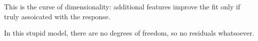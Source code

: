 \documentclass[
]{article}
\newenvironment{Shaded}{\begin{snugshade}}{\end{snugshade}}
\newcommand{\DataTypeTok}[1]{\textcolor[rgb]{0.13,0.29,0.53}{#1}}
\newcommand{\DecValTok}[1]{\textcolor[rgb]{0.00,0.00,0.81}{#1}}
\newcommand{\KeywordTok}[1]{\textcolor[rgb]{0.13,0.29,0.53}{\textbf{#1}}}
\newcommand{\NormalTok}[1]{#1}
\newcommand{\OperatorTok}[1]{\textcolor[rgb]{0.81,0.36,0.00}{\textbf{#1}}}
\newcommand{\StringTok}[1]{\textcolor[rgb]{0.31,0.60,0.02}{#1}}
\begin{document}
This is the curse of dimensionality: additional features improve the fit
only if truly assoicated with the response.

In this stupid model, there are no degrees of freedom, so no residuals
whatsoever.

\begin{Shaded}
\end{Shaded}
\end{document}
